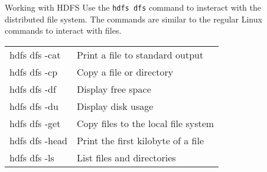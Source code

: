 \documentclass[ignorenonframetext,xcolor=x11names]{beamer}
\begin{document}
   

\begin{frame}{Working with HDFS}
Use the \texttt{hdfs dfs} command to insteract with the distributed file system. The commands are similar to the regular Linux commands to interact with files. \\

\renewcommand{\arraystretch}{1.25}
\begin{tabular}{l|l} \hline
hdfs dfs -cat & Print a file to standard output \\
hdfs dfs -cp & Copy a file or directory\\
hdfs dfs -df & Display free space \\
hdfs dfs -du & Display disk usage \\
hdfs dfs -get & Copy files to the local file system \\
hdfs dfs -head & Print the first kilobyte of a file \\
hdfs dfs -ls & List files and directories \\ \hline
\end{tabular}
\end{frame}
\end{document}
